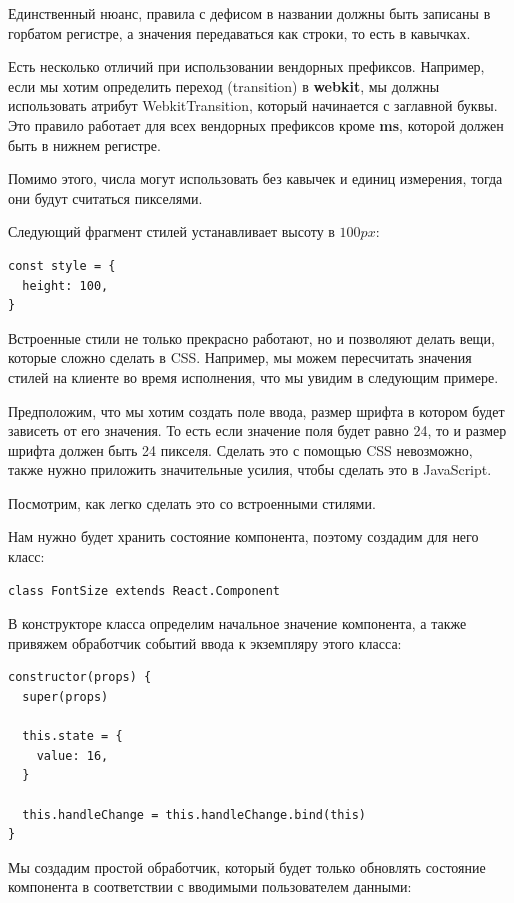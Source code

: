 Единственный нюанс, правила с дефисом в названии должны быть записаны в горбатом регистре, а значения передаваться как строки, то есть в кавычках.

Есть несколько отличий при использовании вендорных префиксов. Например, если мы хотим определить переход (transition) в \textbf{webkit}, мы должны использовать атрибут WebkitTransition, который начинается с заглавной буквы. Это правило работает для всех вендорных префиксов кроме \textbf{ms}, которой должен быть в нижнем регистре.

Помимо этого, числа могут использовать без кавычек и единиц измерения, тогда они будут считаться пикселями.

Следующий фрагмент стилей устанавливает высоту в $100px$:

\begin{lstlisting}
const style = {
  height: 100,
}
\end{lstlisting}

Встроенные стили не только прекрасно работают, но и позволяют делать вещи, которые сложно сделать в CSS. Например, мы можем пересчитать значения стилей на клиенте во время исполнения, что мы увидим в следующим примере.

Предположим, что мы хотим создать поле ввода, размер шрифта в котором будет зависеть от его значения. То есть если значение поля будет равно 24, то и размер шрифта должен быть 24 пикселя. Сделать это с помощью CSS невозможно, также нужно приложить значительные усилия, чтобы сделать это в JavaScript.

Посмотрим, как легко сделать это со встроенными стилями.

Нам нужно будет хранить состояние компонента, поэтому создадим для него класс:

\begin{lstlisting}
class FontSize extends React.Component
\end{lstlisting}

В конструкторе класса определим начальное значение компонента, а также привяжем обработчик событий ввода к экземпляру этого класса:

\begin{lstlisting}
constructor(props) {
  super(props)
  
  this.state = {
    value: 16,
  }
  
  this.handleChange = this.handleChange.bind(this)
}
\end{lstlisting}

Мы создадим простой обработчик, который будет только обновлять состояние компонента в соответствии с вводимыми пользователем данными:

